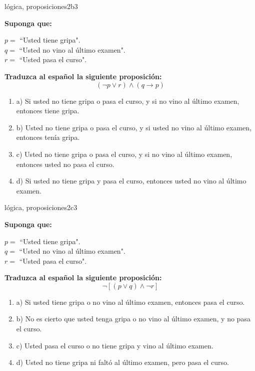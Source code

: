 \documentclass{article}
\begin{document}
\begin{question}{11}{lógica, proposiciones}{2}{b}{3}{
\textbf{Suponga que:} \smallskip

\(p = \) ``Usted tiene gripa".\\
\(q = \) ``Usted no vino al último examen".\\
\(r = \) ``Usted pasa el curso". \smallskip

\textbf{Traduzca al español la siguiente proposición:}
\[
(\neg p \lor r) \land (q \rightarrow p)
\]

\begin{enumerate}
   \item a) Si usted no tiene gripa o pasa el curso, y si no vino al último examen, entonces tiene gripa.  
   \item b) Usted no tiene gripa o pasa el curso, y si usted no vino al último examen, entonces tenía gripa.  
   \item c) Usted no tiene gripa o pasa el curso, y si no vino al último examen, entonces usted no pasa el curso.  
   \item d) Si usted no tiene gripa y pasa el curso, entonces usted no vino al último examen.  
\end{enumerate}
}
\end{question}

\begin{question}{12}{lógica, proposiciones}{2}{c}{3}{
\textbf{Suponga que:} \smallskip

\(p = \) ``Usted tiene gripa".\\
\(q = \) ``Usted no vino al último examen".\\
\(r = \) ``Usted pasa el curso". \smallskip

\textbf{Traduzca al español la siguiente proposición:}
\[
\neg [(p \lor q) \land \neg r]
\]

\begin{enumerate}
   \item a) Si usted tiene gripa o no vino al último examen, entonces pasa el curso.  
   \item b) No es cierto que usted tenga gripa o no vino al último examen, y no pasa el curso.  
   \item c) Usted pasa el curso o no tiene gripa y vino al último examen.  
   \item d) Usted no tiene gripa ni faltó al último examen, pero pasa el curso.  
\end{enumerate}
}
\end{question}
\end{document}
